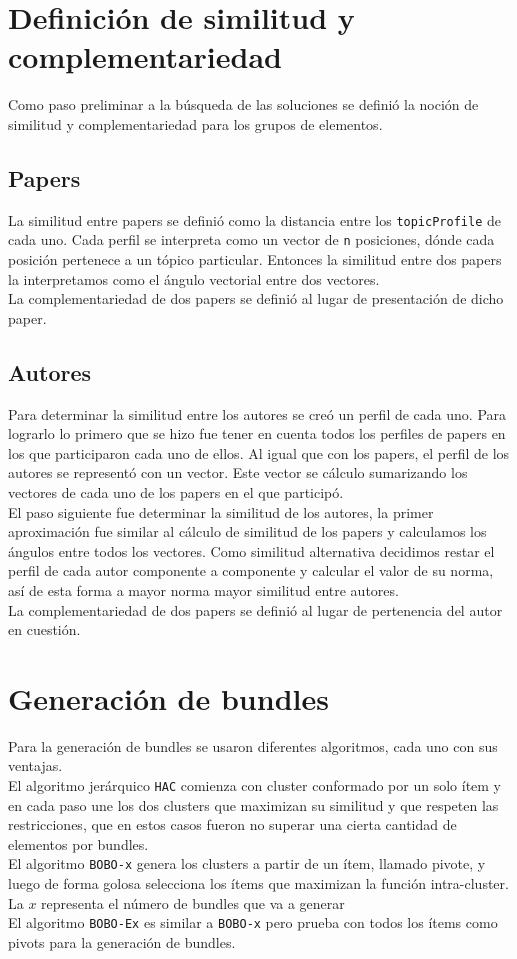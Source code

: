 \section{Definición de similitud y complementariedad}
Como paso preliminar a la búsqueda de las soluciones se definió la noción de similitud y 
complementariedad para los grupos de elementos.
\subsection{Papers}
La similitud entre papers se definió como la distancia entre los \texttt{topicProfile} de cada uno. 
Cada perfil se interpreta como un vector de \texttt{n} posiciones, dónde cada posición pertenece a 
un tópico particular. Entonces la similitud entre dos papers la interpretamos como el ángulo 
vectorial entre dos vectores.\\
La complementariedad de dos papers se definió al lugar de presentación de dicho paper.
\subsection{Autores}
Para determinar la similitud entre los autores se creó un perfil de cada uno. Para lograrlo lo 
primero que se hizo fue tener en cuenta todos los perfiles de papers en los que participaron cada 
uno de ellos. Al igual que con los papers, el perfil de los autores se representó con un vector. 
Este vector se cálculo sumarizando los vectores de cada uno de los papers en el que participó.\\
El paso siguiente fue determinar la similitud de los autores, la primer aproximación fue similar al 
cálculo de similitud de los papers y calculamos los ángulos entre todos los vectores. Como similitud
alternativa decidimos restar el perfil de cada autor componente a componente y calcular el valor de 
su norma, así de esta forma a mayor norma mayor similitud entre autores.\\
La complementariedad de dos papers se definió al lugar de pertenencia del autor en cuestión.
\section{Generación de bundles}
Para la generación de bundles se usaron diferentes algoritmos, cada uno con sus ventajas.\\
El algoritmo jerárquico \texttt{HAC} comienza con cluster conformado por un solo ítem y en cada paso 
une los dos clusters que maximizan su similitud y que respeten las restricciones, que en estos 
casos fueron no superar una cierta cantidad de elementos por bundles.\\
El algoritmo \texttt{BOBO-x} genera los clusters a partir de un ítem, llamado pivote, y luego de 
forma golosa selecciona los ítems que maximizan la función intra-cluster. La $x$ representa el 
número de bundles que va a generar\\
El algoritmo \texttt{BOBO-Ex} es similar a \texttt{BOBO-x} pero prueba con todos los ítems como 
pivots para la generación de bundles.
